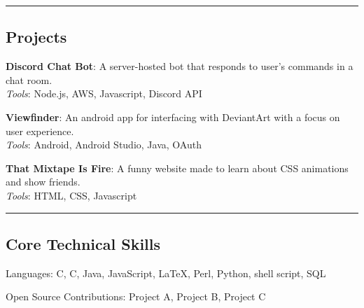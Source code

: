 \documentclass[11pt,letterpaper]{article}
\newenvironment{indentsection}[1]%
{\begin{list}{}%
	{\setlength{\leftmargin}{#1}}%
	\item[]%
}
{\end{list}}
\newcommand{\CPP}
{C\nolinebreak[4]\hspace{-.05em}\raisebox{.22ex}{\footnotesize\bf ++}}
\begin{document}
\hrule
\vspace{-0.4em}
\subsection*{Projects}

\begin{itemize*}
	\item \textbf{Discord Chat Bot}: A server-hosted bot that responds to user's commands in a chat room.
	\\ \emph{Tools}: Node.js, AWS, Javascript, Discord API
	\item \textbf{Viewfinder}: An android app for interfacing with DeviantArt with a focus on user experience.
	\\ \emph{Tools}: Android, Android Studio, Java, OAuth
	\item \textbf{That Mixtape Is Fire}: A funny website made to learn about CSS animations and show friends.
	\\ \emph{Tools}: HTML, CSS, Javascript
\end{itemize*}


\hrule
\vspace{-0.4em}
\subsection*{Core Technical Skills}

\begin{indentsection}{\parindent}
\begin{description*}
	\item[Languages:]
	C, \CPP, Java, JavaScript, \LaTeX, Perl, Python, shell script, SQL
	\item[Open Source Contributions:]
	Project A, Project B, Project C
\end{description*}
\end{indentsection}
\end{document}
